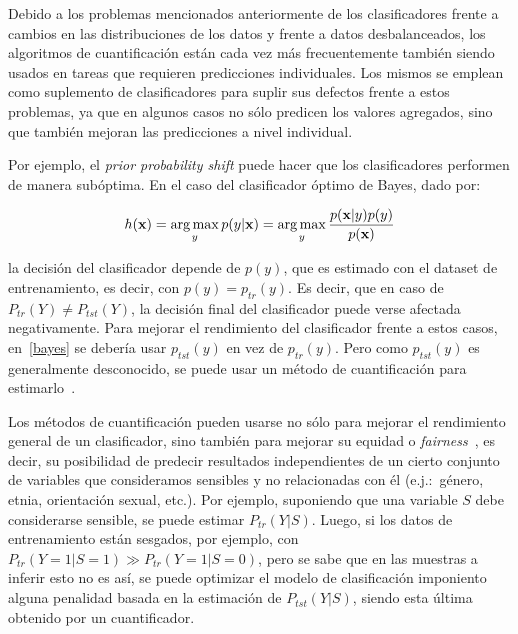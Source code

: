 Debido a los problemas mencionados anteriormente de los clasificadores frente a
cambios en las distribuciones de los datos y frente a datos desbalanceados, los
algoritmos de cuantificación están cada vez más frecuentemente también siendo
usados en tareas que requieren predicciones individuales. Los mismos se emplean
como suplemento de clasificadores para suplir sus defectos frente a estos
problemas, ya que en algunos casos no sólo predicen los valores agregados, sino
que también mejoran las predicciones a nivel individual.

Por ejemplo, el {\it prior probability shift\/} puede hacer que los
clasificadores performen de manera subóptima. En el caso del clasificador óptimo
de Bayes, dado por:

\begin{equation}
    h(\textbf{x}) = \operatorname*{arg\,max}_{y} p(y|\textbf{x}) = \operatorname*{arg\,max}_{y} \frac{p(\textbf{x}|y)p(y)}{p(\textbf{x})}
\end{equation}\label{bayes}

la decisión del clasificador depende de $p(y)$, que es estimado con el dataset
de entrenamiento, es decir, con $p(y) = p_{tr}(y)$. Es decir, que en caso de
$P_{tr}(Y) \neq P_{tst}(Y)$, la decisión final del clasificador puede verse
afectada negativamente. Para mejorar el rendimiento del clasificador frente a
estos casos, en~\ref{bayes} se debería usar $p_{tst}(y)$ en vez de $p_{tr}(y)$.
Pero como $p_{tst}(y)$ es generalmente desconocido, se puede usar un método de
cuantificación para estimarlo~\cite{saerens2002adjusting, alaiz2011class,
zhang2010transfer, xue2009quantification}.

Los métodos de cuantificación pueden usarse no sólo para mejorar el rendimiento
general de un clasificador, sino también para mejorar su equidad o {\it
fairness}~\cite{biswas2021ensuring}, es decir, su posibilidad de predecir
resultados independientes de un cierto conjunto de variables que consideramos
sensibles y no relacionadas con él (e.j.:~género, etnia, orientación sexual,
etc.). Por ejemplo, suponiendo que una variable $S$ debe considerarse sensible,
se puede estimar $P_{tr}(Y|S)$. Luego, si los datos de entrenamiento están
sesgados, por ejemplo, con $P_{tr}(Y=1|S=1) \gg P_{tr}(Y=1|S=0)$, pero se sabe
que en las muestras a inferir esto no es así, se puede optimizar el modelo de
clasificación imponiento alguna penalidad basada en la estimación de
$P_{tst}(Y|S)$, siendo esta última obtenido por un cuantificador.
